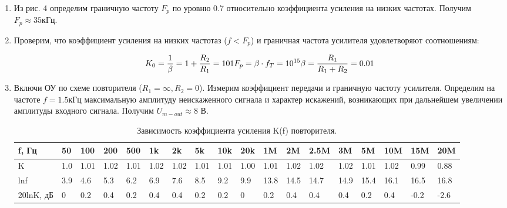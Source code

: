 \documentclass[a4paper]{article}
\begin{document}
\begin{enumerate}
\item  Из рис. 4 определим граничную частоту $F_p$ по уровню 0.7 относительно коэффициента усиления на низких частотах. Получим $F_p \approx 35 кГц$.
\item Проверим, что коэффициент усиления на низких частотаз ($f < F_p$) и граничная частота усилителя удовлетворяют соотношениям:

\begin{equation}
   K_0 = \frac{1}{\beta} = 1 + \frac{R_2}{R_1} = 101 \\
   F_p = \beta \cdot f_T = 10^{15} \\
   \beta = \frac{R_1}{R_1 + R_2} = 0.01 
 \end{equation}

 \item Включи ОУ по схеме повторителя ($R_1 = \infty, R_2 = 0$). Измерим коэффициент передачи и граничную частоту усилителя. Определим на частоте $f = 1.5 кГц$ максимальную амплитуду неискаженного сигнала и характер искажений, возникающих при дальнейшем увеличении амплитуды входного сигнала. Получим $U_{m-out} \approx 8$ В. 


\begin{table}[H]
    \centering
    \begin{center}
    \end{center}
    \vspace{0.1cm}
    \label{tab:my_label}
    \begin{tabular}{|p{2cm}|p{1cm}|p{1cm}|p{1cm}|p{1cm}|p{1cm}|p{1cm}|p{1cm}|p{1cm}|p{1cm}|p{1cm}|p{1cm}|p{1cm}|p{1cm}|p{1cm}|p{1cm}|p{1cm}|p{1cm}|}
        \hline
        f, Гц & 50 & 100 & 200 & 500 & 1k & 2k & 5k & 10k & 20k & 1M  & 2M & 2.5M & 3M & 5M & 10M & 15M & 20M \\ 
        \hline
        K    & 1.0 & 1.01 & 1.02  & 1.01 & 1.02 & 1.02  & 1.01 & 1.01 & 1.00 & 1.01 & 1.02 & 1.02 &  1.02 & 1.01 & 1.02 & 0.99 & 0.88 \\
        \hline
        lnf     & 3.9   & 4.6  & 5.3  & 6.2 & 6.9  & 7.6 & 8.5   & 9.2  & 9.9 &  13.8 & 14.5 & 14.7 & 14.9 & 15.4 & 16.1 & 16.5 & 16.8 \\
        \hline
        20lnK, дБ   &  0  & 0.2  & 0.4 & 0.2 &  0.4  & 0.4  & 0.2 &  0.2 & 0 & 0.2 & 0.4 & 0.4 & 0.4 & 0.2 & 0.4 &-0.2& -2.6\\
        \hline 
        \end{tabular}
        \caption{Зависимость коэффициента усиления K(f) повторителя.}
\end{table}


\end{enumerate}
\end{document}

